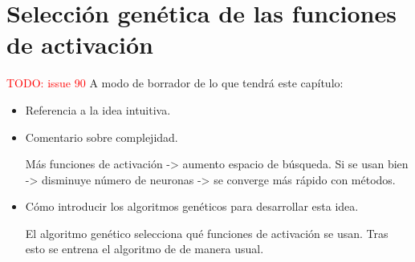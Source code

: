 \newpage
\chapter{Selección genética de las funciones de activación }
\label{ch08:genetic-selection}

\textcolor{red}{TODO: issue 90}
A modo de borrador de lo que tendrá este capítulo: 
\begin{itemize}
    \item Referencia a la idea intuitiva.
    \item Comentario sobre complejidad.
    
    Más funciones de activación -> aumento espacio de búsqueda.
    Si se usan bien -> disminuye número de neuronas 
    -> se converge más rápido con métodos. 
    \item Cómo introducir los algoritmos genéticos para desarrollar esta idea. 
    
    El algoritmo genético selecciona qué funciones de activación se usan. Tras esto se entrena el algoritmo de de manera usual.
\end{itemize}